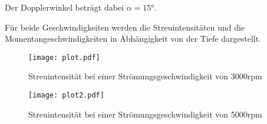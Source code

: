 Der Dopplerwinkel beträgt dabei $\alpha=15°$.

Für beide Geschwindigkeiten werden die Streuintensitäten und die Momentangeschwindigkeiten in Abhängigkeit von der Tiefe dargestellt.


\begin{figure}
  \centering
  \texttt{[image: plot.pdf]}
  \caption{Streuintensität bei einer Strömungsgeschwindigkeit von 3000rpm}
  \label{fig:plot}
\end{figure}



\begin{figure}
  \centering
  \texttt{[image: plot2.pdf]}
  \caption{Streuintensität bei einer Strömungsgeschwindigkeit von 5000rpm}
  \label{fig:plot}
\end{figure}
